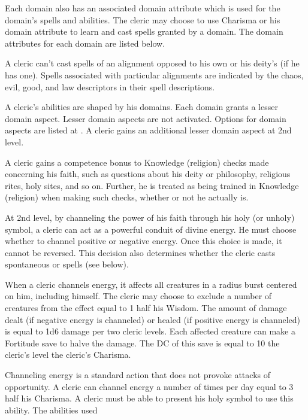 Each domain also has an associated domain attribute which is used for the domain's spells and abilities. The cleric may choose to use Charisma or his domain attribute to learn and cast spells granted by a domain. The domain attributes for each domain are listed below.

 A cleric can't cast spells of an alignment opposed to his own or his deity's (if he has one). Spells associated with particular alignments are indicated by the chaos, evil, good, and law descriptors in their spell descriptions.

 A cleric's abilities are shaped by his domains. Each domain grants a lesser domain aspect. Lesser domain aspects are not activated. Options for domain aspects are listed at . A cleric gains an additional lesser domain aspect at 2nd level.

 A cleric gains a  competence bonus to Knowledge (religion) checks made concerning his faith, such as questions about his deity or philosophy, religious rites, holy sites, and so on. Further, he is treated as being trained in Knowledge (religion) when making such checks, whether or not he actually is.

 At 2nd level, by channeling the power of his faith through his holy (or unholy) symbol, a cleric can act as a powerful conduit of divine energy. He must choose whether to channel positive or negative energy. Once this choice is made, it cannot be reversed. This decision also determines whether the cleric casts spontaneous  or  spells (see below).

When a cleric channels energy, it affects all creatures in a \areamed radius burst centered on him, including himself. The cleric may choose to exclude a number of creatures from the effect equal to 1 \add half his Wisdom. The amount of damage dealt (if negative energy is channeled) or healed (if positive energy is channeled) is equal to 1d6 damage per two cleric levels. Each affected creature can make a Fortitude save to halve the damage. The DC of this save is equal to 10 \add the cleric's level \add the cleric's Charisma.

Channeling energy is a standard action that does not provoke attacks of opportunity. A cleric can channel energy a number of times per day equal to 3 \add half his Charisma. A cleric must be able to present his holy symbol to use this ability. The abilities used 

